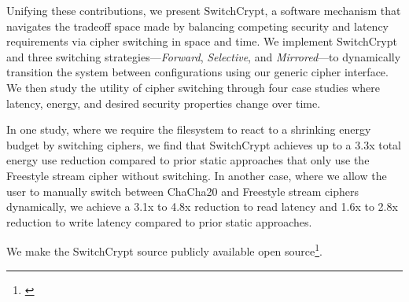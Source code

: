 Unifying these contributions, we present SwitchCrypt, a software mechanism that
navigates the tradeoff space made by balancing competing security and latency
requirements via cipher switching in space and time. We implement SwitchCrypt
and three switching strategies---\emph{Forward}, \emph{Selective}, and
\emph{Mirrored}---to dynamically transition the system between configurations
using our generic cipher interface. We then study the utility of cipher
switching through four case studies where latency, energy, and desired security
properties change over time.

In one study, where we require the filesystem to react to a shrinking energy
budget by switching ciphers, we find that SwitchCrypt achieves up to a 3.3x
total energy use reduction compared to prior static approaches that only use the
Freestyle stream cipher without switching. In another case, where we allow the
user to manually switch between ChaCha20 and Freestyle stream ciphers
dynamically, we achieve a 3.1x to 4.8x reduction to read latency and 1.6x to
2.8x reduction to write latency compared to prior static approaches.

We make the SwitchCrypt source publicly available open
source\footnote{\label{note1}\SystemURI}.
